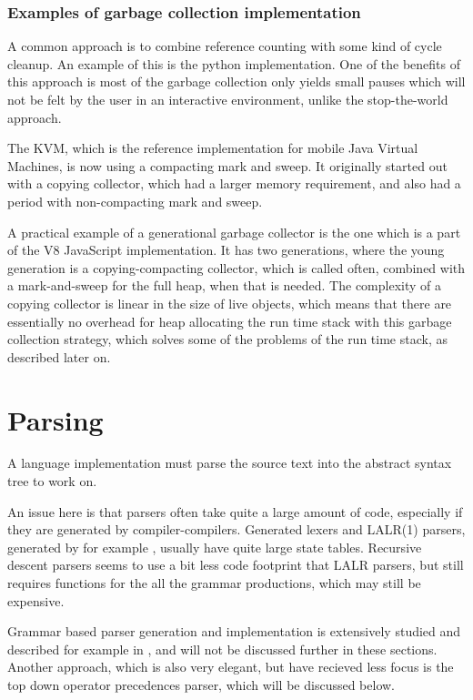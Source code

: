 \documentclass[11pt]{report}
\begin{document}
\subsubsection{Examples of garbage collection implementation}
A common approach is to combine reference counting with some kind of cycle cleanup. 
An example of this is the python implementation. 
One of the benefits of this approach is most of the garbage collection only yields small pauses which will not be felt by the user in an interactive environment, unlike the stop-the-world approach.

The KVM, which is the reference implementation for mobile Java Virtual Machines, is now using a compacting mark and sweep. It originally started out with a copying collector, which had a larger memory requirement, and also had a period with non-compacting mark and sweep.


A practical example of a generational garbage collector is the one which is a part of the V8 JavaScript implementation.
It has two generations, where the young generation is a copying-compacting collector, which is called often, combined with a mark-and-sweep for the full heap, when that is needed.
The complexity of a copying collector is linear in the size of live objects, which means that there are essentially no overhead for heap allocating the run time stack with this garbage collection strategy, which solves some of the problems of the run time stack, as described later on.

\section{Parsing}
A language implementation must parse the source text into the abstract syntax tree to work on. 

An issue here is that parsers often take quite a large amount of code, especially if they are generated by compiler-compilers.
Generated lexers and LALR(1) parsers, generated by for example  \cite{yacc, yacc2}, usually have quite large state tables.
Recursive descent parsers seems to use a bit less code footprint that LALR parsers, but still requires functions for the all the grammar productions, which may still be expensive.

Grammar based parser generation and implementation is extensively studied and described for example in  \cite{basics-of-compiler-design, grammar}, and will not be discussed further in these sections.
Another approach, which is also very elegant, 
but have recieved less focus is the
top down operator precedences parser,
which will be discussed below.
\end{document}
